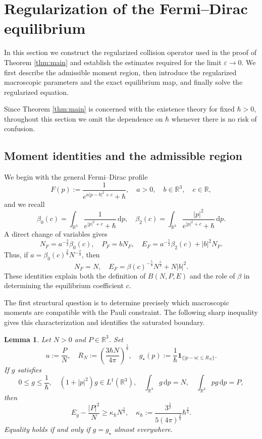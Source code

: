 \documentclass[10pt,reqno]{amsart}
\numberwithin{equation}{section}
\newtheorem{lemma}{Lemma}[section]
\theoremstyle{definition}
\newcommand{\R}{\mathbb R}
\newcommand{\dpp}{\mathrm{d}p}
\newcommand{\kappah}{\kappa_{\hbar}}
\newcommand{\e}{\varepsilon}
\newcommand{\one}{\mathbf 1}
\newcommand{\bq}{\begin{equation}}
\newcommand{\eq}{\end{equation}}
\newcommand{\lt}{\left}
\newcommand{\rt}{\right}
\begin{document}
%
%
%
%
%
%
\section{Regularization of the Fermi--Dirac equilibrium}\label{sec:approx}

In this section we construct the regularized collision operator used in the proof of Theorem \ref{thm:main} and establish the estimates required for the limit $\e\to0$.  We first describe the admissible moment region, then introduce the regularized macroscopic parameters and the exact equilibrium map, and finally solve the regularized equation. 

Since Theorem \ref{thm:main} is concerned with the existence theory for fixed $\hbar>0$, throughout this section we omit the dependence on $\hbar$ whenever there is no risk of confusion.

%
%
%
%
%
%

\subsection{Moment identities and the admissible region}

We begin with the general Fermi--Dirac profile
\[
 F(p):=\frac{1}{e^{a|p-b|^2+c}+\hbar},  \quad a>0,\quad b\in\R^3,\quad c\in\R,
\]
and we recall
\[
 \beta_0(c)=\int_{\R^3}\frac{1}{e^{|p|^2+c}+\hbar}\,\dpp,  \quad  \beta_2(c)=\int_{\R^3}\frac{|p|^2}{e^{|p|^2+c}+\hbar}\,\dpp.
\]
A direct change of variables gives
\bq \label{eq:FD-mom-com}
 N_F=a^{-\frac32}\beta_0(c),\quad  P_F=bN_F,\quad  E_F=a^{-\frac52}\beta_2(c)+|b|^2N_F.
\eq
Thus, if $a=\beta_0(c)^{\frac23}N^{-\frac23}$, then
\bq\label{eq:FD-mom}
 N_F=N,\quad  E_F=\beta(c)^{-\frac53}N^{\frac53}+N|b|^2.
\eq
These identities explain both the definition of $B(N,P,E)$ and the role of $\beta$ in determining the equilibrium coefficient $c$.

The first structural question is to determine precisely which macroscopic moments are compatible with the Pauli constraint.  The following sharp inequality gives this characterization and identifies the saturated boundary.


\begin{lemma}\label{lem:sharp-pauli}
Let $N>0$ and $P\in\R^3$.  Set
\[
 u:=\frac PN,  \quad  R_N:=\lt(\frac{3\hbar N}{4\pi}\rt)^{\frac13},  \quad  g_\star(p):=\frac1\hbar\one_{\{|p-u|\leq R_N\}}.
\]
If $g$ satisfies
\[
 0\leq g\leq\frac1\hbar ,  \quad  (1+|p|^2)g\in L^1(\R^3), \quad   \int_{\R^3}g\,\dpp=N,  \quad  \int_{\R^3}pg\,\dpp=P,
\]
then
\bq \label{eq:sharp-pauli}
 E_g-\frac{|P|^2}{N}  \geq \kappah N^{\frac53},  \quad  \kappah:=\frac{3^{\frac53}}{5(4\pi)^{\frac23}}\hbar^{\frac23}.
\eq
Equality holds if and only if $g=g_\star$ almost everywhere.
\end{lemma}
\end{document}
